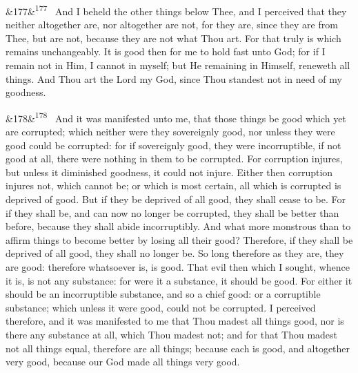 \documentclass[12pt]{article}
\newcommand{\para}[1][]{\par\noindent\ifx&#1&\else\textsuperscript{\footnotesize #1}~\fi}
\begin{document}
\para[177] And I beheld the other things below Thee, and I perceived that they neither altogether are, nor altogether are not, for they are, since they are from Thee, but are not, because they are not what Thou art. For that truly is which remains unchangeably. It is good then for me to hold fast unto God; for if I remain not in Him, I cannot in myself; but He remaining in Himself, reneweth all things. And Thou art the Lord my God, since Thou standest not in need of my goodness.

\para[178] And it was manifested unto me, that those things be good which yet are corrupted; which neither were they sovereignly good, nor unless they were good could be corrupted: for if sovereignly good, they were incorruptible, if not good at all, there were nothing in them to be corrupted. For corruption injures, but unless it diminished goodness, it could not injure. Either then corruption injures not, which cannot be; or which is most certain, all which is corrupted is deprived of good. But if they be deprived of all good, they shall cease to be. For if they shall be, and can now no longer be corrupted, they shall be better than before, because they shall abide incorruptibly. And what more monstrous than to affirm things to become better by losing all their good? Therefore, if they shall be deprived of all good, they shall no longer be. So long therefore as they are, they are good: therefore whatsoever is, is good. That evil then which I sought, whence it is, is not any substance: for were it a substance, it should be good. For either it should be an incorruptible substance, and so a chief good: or a corruptible substance; which unless it were good, could not be corrupted. I perceived therefore, and it was manifested to me that Thou madest all things good, nor is there any substance at all, which Thou madest not; and for that Thou madest not all things equal, therefore are all things; because each is good, and altogether very good, because our God made all things very good.
\end{document}
